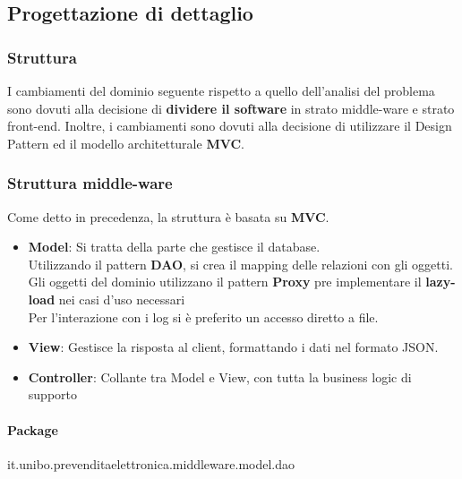 \documentclass[a4paper]{article}
\begin{document}
\newpage

\subsection{Progettazione di dettaglio}


\subsubsection{Struttura}

I cambiamenti del dominio seguente rispetto a quello dell’analisi del problema sono dovuti
alla decisione di \textbf{dividere il software} in strato middle-ware e strato front-end. Inoltre, i cambiamenti sono dovuti alla decisione di utilizzare il Design Pattern ed il modello architetturale \textbf{MVC}.

\subsubsection{Struttura middle-ware}

Come detto in precedenza, la struttura è basata su \textbf{MVC}.

\begin{itemize}
    \item \textbf{Model}: Si tratta della parte che gestisce il database.\\Utilizzando il pattern \textbf{DAO}, si crea il mapping delle relazioni con gli oggetti.\\Gli oggetti del dominio utilizzano il pattern \textbf{Proxy} pre implementare il \textbf{lazy-load} nei casi d'uso necessari\\Per l'interazione con i log si è preferito un accesso diretto a file.
    \item \textbf{View}: Gestisce la risposta al client, formattando i dati nel formato JSON.
    \item \textbf{Controller}: Collante tra Model e View, con tutta la business logic di supporto
\end{itemize}

\paragraph{Package} it.unibo.prevenditaelettronica.middleware.model.dao
\end{document}
